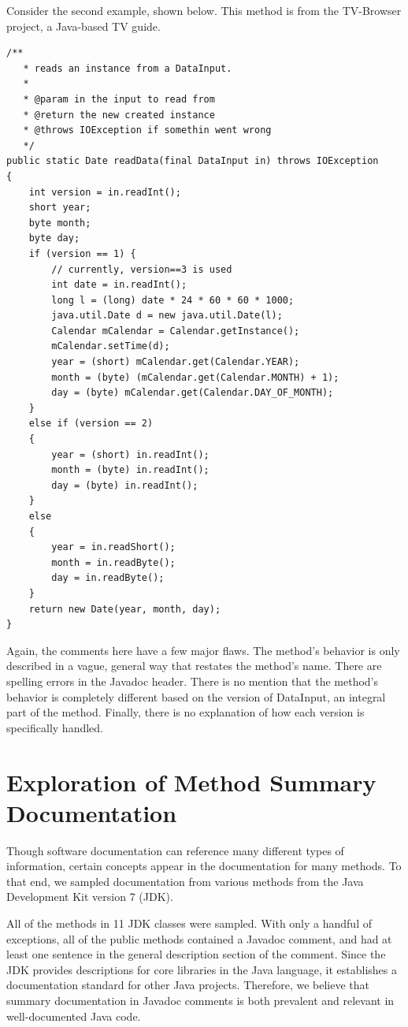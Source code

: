 \documentclass[preprint]{sigplanconf}
\begin{document}
Consider the second example, shown below. This method is from the TV-Browser project, a Java-based TV guide.

\begin{lstlisting}
/**
   * reads an instance from a DataInput.
   *
   * @param in the input to read from
   * @return the new created instance
   * @throws IOException if somethin went wrong
   */
public static Date readData(final DataInput in) throws IOException
{
    int version = in.readInt();
    short year;
    byte month;
    byte day;
    if (version == 1) {
        // currently, version==3 is used
        int date = in.readInt();
        long l = (long) date * 24 * 60 * 60 * 1000;
        java.util.Date d = new java.util.Date(l);
        Calendar mCalendar = Calendar.getInstance();
        mCalendar.setTime(d);
        year = (short) mCalendar.get(Calendar.YEAR);
        month = (byte) (mCalendar.get(Calendar.MONTH) + 1);
        day = (byte) mCalendar.get(Calendar.DAY_OF_MONTH);
    }
    else if (version == 2)
    {
        year = (short) in.readInt();
        month = (byte) in.readInt();
        day = (byte) in.readInt();
    }
    else
    {
        year = in.readShort();
        month = in.readByte();
        day = in.readByte();
    }
    return new Date(year, month, day);
}
\end{lstlisting}

Again, the comments here have a few major flaws. The method's behavior is only described in a vague, general way that restates the method's name. There are spelling errors in the Javadoc header. There is no mention that the method's behavior is completely different based on the version of DataInput, an integral part of the method. Finally, there is no explanation of how each version is specifically handled.

\section{Exploration of Method Summary Documentation}
Though software documentation can reference many different types of information, certain concepts appear in the documentation for many methods. To that end, we sampled documentation from various methods from the Java Development Kit version 7 (JDK).

All of the methods in 11 JDK classes were sampled. With only a handful of exceptions, all of the public methods contained a Javadoc comment, and had at least one sentence in the general description section of the comment. Since the JDK provides descriptions for core libraries in the Java language, it establishes a documentation standard for other Java projects. Therefore, we believe that summary documentation in Javadoc comments is both prevalent and relevant in well-documented Java code.
\end{document}
